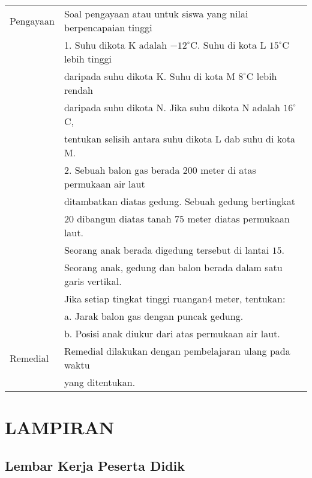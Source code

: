 \documentclass[a5paper,10pt,openany]{book}
\begin{document}
{\color{magenta}
\begin{table}[H]
	\centering
	\begin{tabular}{@{}ll@{}}
		\toprule
		Pengayaan& Soal pengayaan atau untuk siswa yang nilai berpencapaian tinggi \\ 
		&1.	Suhu dikota K adalah $-12^\circ$C. Suhu di kota L $15^\circ$C lebih tinggi\\& daripada suhu dikota K. Suhu di kota M $8^\circ$C lebih rendah\\& daripada suhu dikota N. Jika suhu dikota N adalah $16^\circ$C,\\ &tentukan selisih antara suhu dikota L dab suhu di kota M.\\
		&2.	Sebuah balon gas berada $200$ meter di atas permukaan air laut\\& ditambatkan diatas gedung. Sebuah gedung bertingkat\\& $20$ dibangun diatas tanah $75$ meter diatas permukaan laut.\\& Seorang anak berada digedung tersebut di lantai $15$.\\& Seorang anak, gedung dan balon berada dalam satu garis vertikal.\\&
		Jika setiap tingkat tinggi ruangan$ $4 meter, tentukan:\\&
		a.	Jarak balon gas dengan puncak gedung.\\&
		b.	Posisi anak diukur dari atas permukaan air laut.\\
		\midrule
		Remedial& Remedial dilakukan dengan pembelajaran ulang pada waktu\\& yang ditentukan.\\
		\bottomrule
	\end{tabular}
\end{table}
}


\chapter{LAMPIRAN}

\section{Lembar Kerja Peserta Didik}
\end{document}
